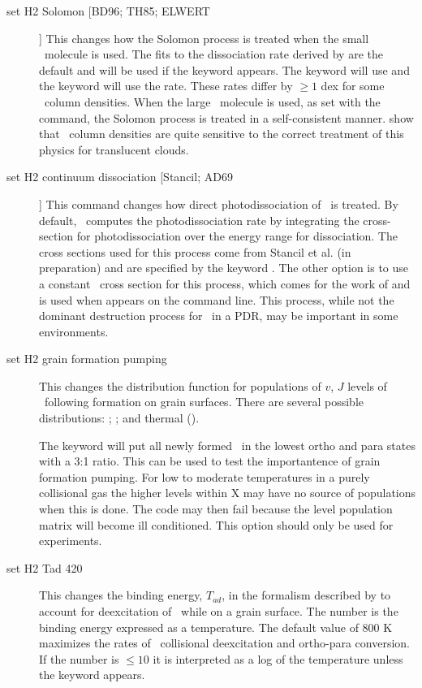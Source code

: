\begin{description}
\item[set H2 Solomon [BD96; TH85; ELWERT]]  This changes how the Solomon process
is treated when the small \htwo\ molecule is used.  The fits to the dissociation
rate derived by \citet{Elwert2006} are the default and will be used if
the keyword  appears.  The keyword  will use \citet{Bertoldi1996} and the keyword  will use the \citet{Tielens1985a} rate.
These rates differ by $\ge1$ dex for some \htwo\ column densities.  When the large
\htwo\ molecule is used, as set with the  command,
the Solomon
process is treated in a self-consistent manner.
\citet{Abel2004} show
that \htwo\ column densities are quite sensitive to the correct
treatment of this physics for translucent clouds.

\item[set H2 continuum dissociation [Stancil; AD69]]  
This command changes how direct photodissociation
of \htwo\ is treated.  
By default, \Cloudy\ computes the photodissociation rate 
by integrating the cross-section
for photodissociation over the energy range for dissociation.  
The cross sections used for this process come from 
Stancil et al. (in preparation) and are specified by the 
keyword .  
The other option 
is to use a constant \htwo\ cross section for this process, 
which comes for the work of \citet{Allison1969} and 
is used when  appears on the command line.  
This process, while not the dominant destruction
process for \htwo\ in a PDR, may be important in some environments.

\item[set H2 grain formation pumping]  This changes
the distribution function
for populations of $v$, $J$ levels of \htwo\ following formation on grain surfaces.
There are several possible
distributions: \citet[, this is the default]{Takahashi2001};
\citet[]{Draine1996}; and thermal ().

The keyword  will put all newly formed \htwo\ in the lowest ortho and
para states with a 3:1 ratio.
This can be used to test the importantence of grain formation pumping.
For low to moderate temperatures in a purely collisional gas
the higher levels within X may have no 
source of populations when this is done.
The code may then fail because the level population matrix will become ill conditioned.
This option should only be used for experiments.

\item[set H2 Tad 420]  This changes the binding energy,
$T_{ad}$, in the formalism
described by \citet{LeBourlot2000} to account for deexcitation
of \htwo\ while on
a grain surface.
The number is the binding energy expressed as a
temperature.
The default value of 800 K maximizes the rates of \htwo\ collisional deexcitation and ortho-para conversion.
If the number is
$\le 10$ it is interpreted as a log of the temperature
unless the keyword  appears.
\end{description}

